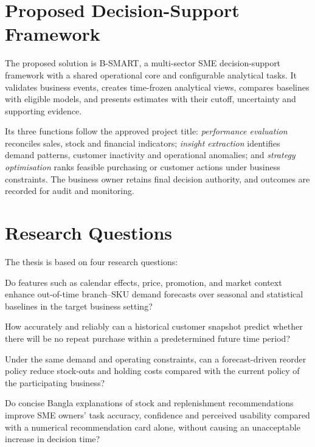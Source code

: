 \documentclass[a4paper,11pt,oneside]{book}
\theoremstyle{plain}
\theoremstyle{definition}
\theoremstyle{remark}
\newcommand{\system}{B-SMART}
\begin{document}
\section{Proposed Decision-Support Framework}
The proposed solution is \system{}, a multi-sector SME decision-support
framework with a shared operational core and configurable analytical tasks.
It validates business events, creates time-frozen analytical views, compares
baselines with eligible models, and presents estimates with their cutoff,
uncertainty and supporting evidence.

Its three functions follow the approved project title:
\emph{performance evaluation} reconciles sales, stock and financial indicators;
\emph{insight extraction} identifies demand patterns, customer inactivity and
operational anomalies; and \emph{strategy optimisation} ranks feasible
purchasing or customer actions under business constraints. The business owner retains
final decision authority, and outcomes are recorded for audit and monitoring.

\section{Research Questions}

The thesis is based on four research questions:

\begin{description}[style=nextline,leftmargin=2em]

\item[RQ1.] Do features such as calendar effects, price, promotion, and market context enhance out-of-time branch--SKU demand forecasts over seasonal and statistical baselines in the target business setting?

\item[RQ2.] How accurately and reliably can a historical customer snapshot predict whether there will be no repeat purchase within a predetermined future time period?

\item[RQ3.] Under the same demand and operating constraints, can a forecast-driven reorder policy reduce stock-outs and holding costs compared with the current policy of the participating business?

\item[RQ4.] Do concise Bangla explanations of stock and replenishment recommendations improve SME owners' task accuracy, confidence and perceived usability compared with a numerical recommendation card alone, without causing an unacceptable increase in decision time?

\end{description}
\end{document}

